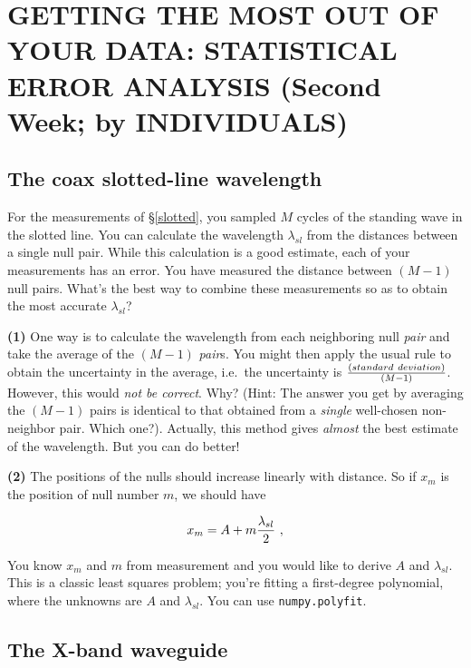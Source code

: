 \documentclass[12pt,preprint]{aastex}
\begin{document}
\section {GETTING THE MOST OUT OF YOUR DATA: STATISTICAL ERROR
ANALYSIS (Second Week; by INDIVIDUALS)} \label{secondweek}

\subsection{The coax slotted-line wavelength} \label{lbandcoax} 
\label{slottedls}

	For the measurements of \S \ref{slotted}, you sampled $M$
        cycles of the standing wave in the slotted line. You can
        calculate the wavelength $\lambda_{sl}$ from the distances
        between a single null pair. While this calculation is a good
        estimate, each of your measurements has an error. You have
        measured the distance between $(M-1)$ null pairs. What's the
        best way to combine these measurements so as to obtain the most
        accurate $\lambda_{sl}$?

{\bf (1)} One way is to calculate the wavelength from each neighboring
null {\it pair} and take the average of the $(M-1)$ {\it pair}s.  You
might then apply the usual rule to obtain the uncertainty in the
average, i.e.\ the uncertainty is $(standard \ deviation) \over (M-1)$.
However, this would {\it not be correct}.  Why? (Hint: The answer you
get by averaging the $(M-1)$ pairs is identical to that obtained from a
{\it single} well-chosen non-neighbor pair.  Which one?).  Actually,
this method gives {\it almost} the best estimate of the wavelength.  But
you can do better!

	{\bf (2)} The positions of the nulls should increase linearly
with distance. So if $x_{m}$ is the position of null number $m$, we
should have

\begin{equation}
x_m = A + m {\lambda_{sl} \over 2} \ ,
\end{equation}

\noindent You know $x_m$ and $m$ from measurement and you would like to
derive $A$ and $\lambda_{sl}$. This is a classic least squares problem;
you're fitting a first-degree polynomial, where the unknowns are $A$ and
$\lambda_{sl}$. You can use {\tt numpy.polyfit}.

\subsection{The X-band waveguide}
\end{document}
